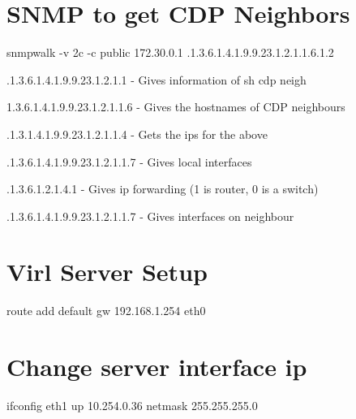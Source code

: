 \documentclass[11pt]{report}
\begin{document}
\section*{SNMP to get CDP Neighbors}

snmpwalk -v 2c -c public 172.30.0.1 .1.3.6.1.4.1.9.9.23.1.2.1.1.6.1.2

.1.3.6.1.4.1.9.9.23.1.2.1.1 - Gives information of sh cdp neigh

1.3.6.1.4.1.9.9.23.1.2.1.1.6  - Gives the hostnames of CDP neighbours 

.1.3.1.4.1.9.9.23.1.2.1.1.4 - Gets the ips for the above

.1.3.6.1.4.1.9.9.23.1.2.1.1.7 - Gives local interfaces

.1.3.6.1.2.1.4.1 - Gives ip forwarding (1 is router, 0 is a switch)

.1.3.6.1.4.1.9.9.23.1.2.1.1.7 - Gives interfaces on neighbour

\section{Virl Server Setup}
route add default gw 192.168.1.254 eth0

\section{Change server interface ip}
ifconfig eth1 up 10.254.0.36 netmask 255.255.255.0



\end{document}
